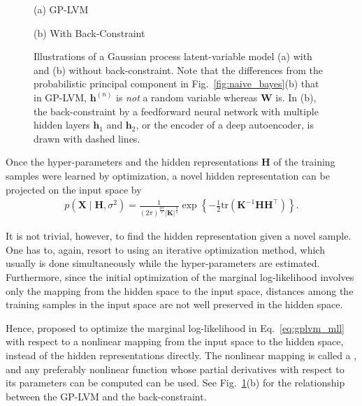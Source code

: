 \documentclass[dissertation,nocontribution]{aaltoseries}
\newcommand{\vect}[1]{\mathbf{#1}}
\newcommand{\matr}[1]{\mathbf{#1}}
\newcommand{\vh}[0]{\vect{h}}
\newcommand{\mW}[0]{\matr{W}}
\newcommand{\mX}[0]{\matr{X}}
\newcommand{\mK}[0]{\matr{K}}
\newcommand{\mH}[0]{\matr{H}}
\begin{document}
\begin{figure}[t]
    \vspace{2mm}
    \begin{minipage}{0.48\textwidth}
        \centering
        \small
        (a) GP-LVM
    \end{minipage}
    \begin{minipage}{0.48\textwidth}
        \centering
        \small
        (b) With Back-Constraint
    \end{minipage}
    \caption{Illustrations of a Gaussian process
    latent-variable model (a) with and (b) without
    back-constraint. Note that the differences from the
    probabilistic principal component in
    Fig.~\ref{fig:naive_bayes}(b) that in GP-LVM,
    $\vh^{(n)}$ is \textit{not} a random variable whereas
    $\mW$ is. In (b), the back-constraint by a feedforward
    neural network with multiple hidden layers $\vh_1$ and
    $\vh_2$, or the encoder of a deep autoencoder, is drawn
    with dashed lines.}
    \label{fig:gplvm}
\end{figure}

Once the hyper-parameters and the hidden representations $\mH$ of
the training samples were learned by optimization, a novel hidden
representation can be projected on the input space by 
\begin{align*}
    p(\mX \mid \mH, \sigma^2) = \frac{1}{(2\pi)^{\frac{qN}{2}}
    \left| \mK \right|^{\frac{q}{2}}} \exp \left\{
    -\frac{1}{2} \text{tr} (\mK^{-1} \mH \mH^\top) \right\}.
\end{align*}

It is not trivial, however, to find the hidden representation
given a novel sample. One has to, again, resort to using an
iterative optimization method, which usually is done
simultaneously while the hyper-parameters are estimated.
Furthermore, since the initial optimization of the marginal
log-likelihood involves only the mapping from the hidden
space to the input space, distances among the training
samples in the input space are not well preserved in the
hidden space.

Hence, \citet{Lawrence2006} proposed to optimize the
marginal log-likelihood in Eq.~\eqref{eq:gplvm_mll} with
respect to a nonlinear mapping from the input space to the
hidden space, instead of the hidden representations
directly. The nonlinear mapping is called a
, and any preferably nonlinear
function whose partial derivatives with respect to its
parameters can be computed can be used. See
Fig.~\ref{fig:gplvm}(b) for the relationship between the
GP-LVM and the back-constraint.
\end{document}
